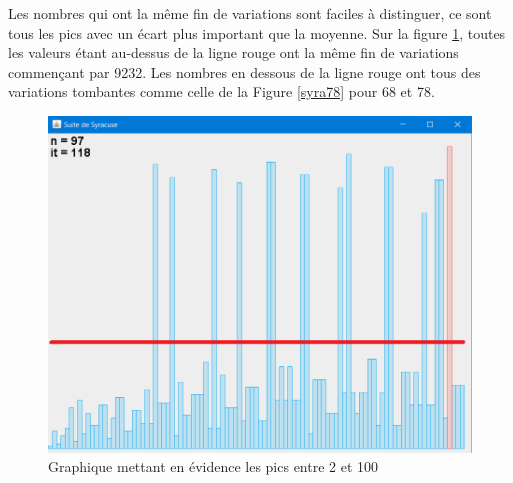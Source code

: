Les nombres qui ont la même fin de variations sont faciles à distinguer, ce sont tous les pics avec un écart plus important que la moyenne. Sur la figure \ref{pics}, toutes les valeurs étant au-dessus de la ligne rouge ont la même fin de variations commençant par 9232. Les nombres en dessous de la ligne rouge ont tous des variations tombantes comme celle de la Figure \ref{syra78} pour 68 et 78.

\begin{figure}[H]
\includegraphics[scale=0.5]{images/syracuse_pics.PNG}
\centering
\caption{Graphique mettant en évidence les pics entre 2 et 100}
\label{pics}
\end{figure}

